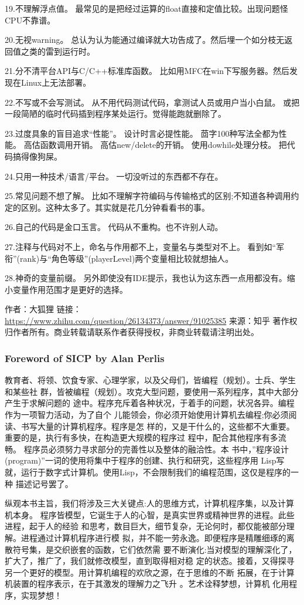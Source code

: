 \documentclass[11pt]{article}
\begin{document}
19.不理解浮点值。
最常见的是把经过运算的float直接和定值比较。出现问题怪CPU不靠谱。

20.无视warning。
总认为认为能通过编译就大功告成了。然后埋一个如分枝无返回值之类的雷到运行时。

21.分不清平台API与C/C++标准库函数。
比如用MFC在win下写服务器。然后发现在Linux上无法部署。

22.不写或不会写测试。
从不用代码测试代码，拿测试人员或用户当小白鼠。
或把一段简陋的临时代码插到程序某处运行。觉得能跑就删除了。

23.过度具象的盲目追求“性能”。
设计时言必提性能。
茴字100种写法全都为性能。
高估函数调用开销。
高估new/delete的开销。
使用dowhile处理分枝。
把代码搞得像狗屎。

24.只用一种技术/语言/平台。
一切没听过的东西都不存在。

25.常见问题不想了解。
比如不理解字符编码与传输格式的区别;不知道各种调用约定的区别。这种太多了。其实就是花几分钟看看书的事。

26.自己的代码是金口玉言。
代码从不重构。也不许别人动。

27.注释与代码对不上，命名与作用都不上，变量名与类型对不上。
看到如“军衔”(rank)与“角色等级”(playerLevel)两个变量相比较就想抽人。

28.神奇的变量前缀。
另外即使没有IDE提示，我也认为这东西一点用都没有。缩小变量作用范围才是更好的选择。

作者：大狐狸
链接：\url{https://www.zhihu.com/question/26134373/answer/91025385}
来源：知乎
著作权归作者所有。商业转载请联系作者获得授权，非商业转载请注明出处。
\subsubsection*{Foreword of SICP by Alan Perlis}
\label{sec:orgheadline154}
教育者、将领、饮食专家、心理学家，以及父母们，皆编程（规划）。士兵、学生和某些社
群，皆被编程（规划）。攻克大型问题，要使用一系列程序，其中大部分产生于求解问题的
途中。程序充斥着各种状况，于着手的问题，状况各异。编程作为一项智力活动，为了自个
儿能领会，你必须开始使用计算机去编程;你必须阅读、书写大量的计算机程序。程序是怎
样的，又是干什么的，这些都不大重要。重要的是，执行有多快，在构造更大规模的程序过
程中，配合其他程序有多流畅。 程序员必须努力寻求部分的完善性以及整体的融洽性。本
书中，”程序设计(program)”一词的使用将集中于程序的创建、执行和研究，这些程序用
Lisp写就，运行于数字式计算机。使用Lisp，不会限制我们的编程范围，这仅是程序的一种
描述记号罢了。

纵观本书主旨，我们将涉及三大关键点:人的思维方式，计算机程序集，以及计算机本身。
程序皆模型，它诞生于人的心智，是真实世界或精神世界的进程。此些进程，起于人的经验
和思考，数目巨大，细节复杂，无论何时，都仅能被部分理解。进程通过计算机程序进行模
拟，并不能一劳永逸。即便程序是精雕细琢的离散符号集，是交织嵌套的函数，它们依然需
要不断演化:当对模型的理解深化了，扩大了，推广了，我们就修改模型，直到取得相对稳
定的状态。接着，又得探寻另一个更好的模型。用计算机编程的欢欣之源，在于思维的不断
拓展，在于计算机装置的程序表示，在于其激发的理解力之飞升 。艺术诠释梦想，计算机
化用程序，实现梦想！
\end{document}
